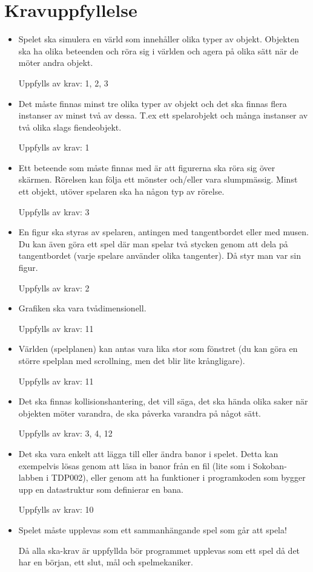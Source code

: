 \documentclass{TDP005mall}
\begin{document}
\section{Kravuppfyllelse}
\begin{itemize}
\item Spelet ska simulera en värld som innehåller olika typer av objekt. Objekten ska ha olika beteenden och röra sig i världen och agera på olika sätt när de möter andra objekt.

Uppfylls av krav: 1, 2, 3
\item Det måste finnas minst tre olika typer av objekt och det ska finnas flera instanser av minst två av dessa. T.ex ett spelarobjekt och många instanser av två olika slags fiendeobjekt.

Uppfylls av krav: 1
\item Ett beteende som måste finnas med är att figurerna ska röra sig över skärmen. Rörelsen kan följa ett mönster och/eller vara slumpmässig. Minst ett objekt, utöver spelaren ska ha någon typ av rörelse.

Uppfylls av krav: 3
\item En figur ska styras av spelaren, antingen med tangentbordet eller med musen. Du kan även göra ett spel där man spelar två stycken genom att dela på tangentbordet (varje spelare använder olika tangenter). Då styr man var sin figur.

Uppfylls av krav: 2
\item Grafiken ska vara tvådimensionell.

Uppfylls av krav: 11
\item Världen (spelplanen) kan antas vara lika stor som fönstret (du kan göra en större spelplan med scrollning, men det blir lite krångligare).

Uppfylls av krav: 11
\item Det ska finnas kollisionshantering, det vill säga, det ska hända olika saker när objekten möter varandra, de ska påverka varandra på något sätt. 

Uppfylls av krav: 3, 4, 12
\item Det ska vara enkelt att lägga till eller ändra banor i spelet. Detta kan exempelvis lösas genom att läsa in banor från en fil (lite som i Sokoban-labben i TDP002), eller genom att ha funktioner i programkoden som bygger upp en datastruktur som definierar en bana.

Uppfylls av krav: 10
\item Spelet måste upplevas som ett sammanhängande spel som går att spela!

Då alla ska-krav är uppfyllda bör programmet upplevas som ett spel då det har en början, ett slut, mål och spelmekaniker. 
\end{itemize}
\end{document}
